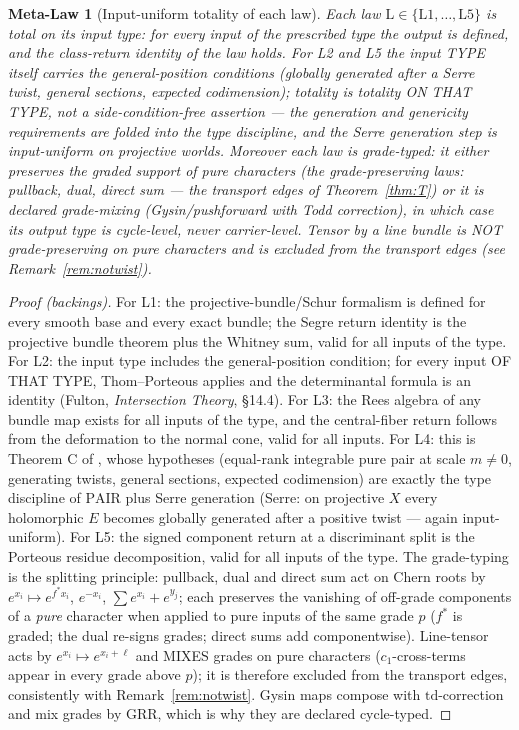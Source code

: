\documentclass[11pt]{article}
\newtheorem{meta-law}[theorem]{Meta-Law}
\begin{document}
\begin{meta-law}[Input-uniform totality of each law]
\label{law:MU1}
Each law $\mathrm L\in\{\mathrm{L1},\dots,\mathrm{L5}\}$ is \emph{total on
its input type}: for \emph{every} input of the prescribed type the output is
defined, and the class-return identity of the law holds.  For L2 and L5 the
input TYPE itself carries the general-position conditions (globally generated
after a Serre twist, general sections, expected codimension); totality is
totality ON THAT TYPE, not a side-condition-free assertion --- the generation
and genericity requirements are folded into the type discipline, and the
Serre generation step is input-uniform on projective worlds.  Moreover each
law is \emph{grade-typed}: it either preserves the graded support of pure
characters (the grade-preserving laws: pullback, dual, direct sum --- the
transport edges of Theorem~\ref{thm:T}) or it is declared grade-mixing
(Gysin/pushforward with Todd correction), in which case its output type is
cycle-level, never carrier-level.  Tensor by a line bundle is NOT
grade-preserving on pure characters and is excluded from the transport edges
(see Remark~\ref{rem:notwist}).
\end{meta-law}

\begin{proof}[Proof (backings)]
For L1: the projective-bundle/Schur formalism is defined for every smooth
base and every exact bundle; the Segre return identity is the projective
bundle theorem plus the Whitney sum, valid for all inputs of the type.  For
L2: the input type includes the general-position condition; for every input
OF THAT TYPE, Thom--Porteous applies and the determinantal formula is an
identity (Fulton, \emph{Intersection Theory}, \S14.4).  For L3: the Rees algebra of any bundle map exists for all
inputs of the type, and the central-fiber return follows from the deformation
to the normal cone, valid for all inputs.  For L4: this is Theorem C of
\cite{GST-gr25}, whose hypotheses (equal-rank integrable pure pair at scale
$m\ne0$, generating twists, general sections, expected codimension) are
exactly the type discipline of $\mathrm{PAIR}$ plus Serre generation
(Serre: on projective $X$ every holomorphic $E$ becomes globally generated
after a positive twist --- again input-uniform).  For L5: the signed
component return at a discriminant split is the Porteous residue
decomposition, valid for all inputs of the type.  The grade-typing is the
splitting principle: pullback, dual and direct sum act on Chern roots by
$e^{x_i}\mapsto e^{f^*x_i}$, $e^{-x_i}$, $\sum e^{x_i}+e^{y_j}$; each
preserves the vanishing of off-grade components of a \emph{pure} character
when applied to pure inputs of the same grade $p$ ($f^*$ is graded; the dual
re-signs grades; direct sums add componentwise).  Line-tensor acts by
$e^{x_i}\mapsto e^{x_i+\ell}$ and MIXES grades on pure characters
($c_1$-cross-terms appear in every grade above $p$); it is therefore excluded
from the transport edges, consistently with Remark~\ref{rem:notwist}.  Gysin
maps compose with $\mathrm{td}$-correction and mix grades by GRR, which is
why they are declared cycle-typed.
\end{proof}
\end{document}
